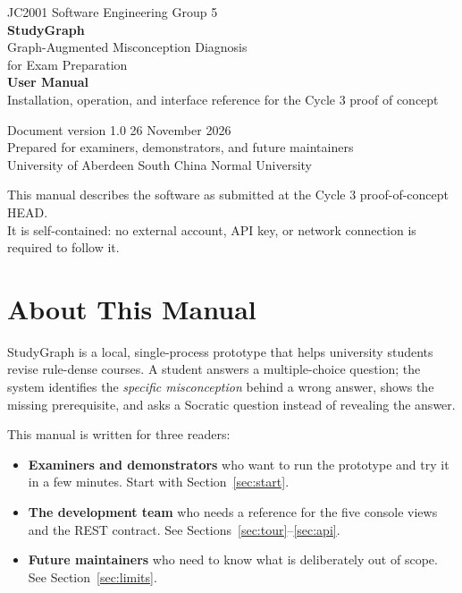 \documentclass[11pt,a4paper]{article}
\begin{document}
\begin{titlepage}
\centering
\vspace*{3.2cm}
{\sffamily\small\color{soft} JC2001 Software Engineering \textperiodcentered{} Group 5}\\[0.5cm]
{\sffamily\bfseries\fontsize{34}{40}\selectfont\color{ink} StudyGraph}\\[0.35cm]
{\sffamily\large\color{soft} Graph-Augmented Misconception Diagnosis\\ for Exam Preparation}\\[2.2cm]
{\sffamily\bfseries\Large\color{accent} User Manual}\\[0.3cm]
{\sffamily\normalsize\color{soft} Installation, operation, and interface reference for the Cycle 3 proof of concept}\\[3.2cm]

\begin{minipage}{0.78\textwidth}
\centering
{\sffamily\small\color{soft}
Document version 1.0 \textperiodcentered{} 26 November 2026\\[0.2cm]
Prepared for examiners, demonstrators, and future maintainers\\
University of Aberdeen \textperiodcentered{} South China Normal University}
\end{minipage}

\vfill
{\sffamily\footnotesize\color{soft} This manual describes the software as submitted at the Cycle 3 proof-of-concept HEAD.\\
It is self-contained: no external account, API key, or network connection is required to follow it.}
\end{titlepage}

\tableofcontents
\newpage

\section{About This Manual}

StudyGraph is a local, single-process prototype that helps university students revise rule-dense courses.
A student answers a multiple-choice question; the system identifies the \emph{specific misconception} behind a
wrong answer, shows the missing prerequisite, and asks a Socratic question instead of revealing the answer.

This manual is written for three readers:

\begin{itemize}[leftmargin=1.4em,itemsep=0.15em]
  \item \textbf{Examiners and demonstrators} who want to run the prototype and try it in a few minutes. Start with Section~\ref{sec:start}.
  \item \textbf{The development team} who needs a reference for the five console views and the REST contract. See Sections~\ref{sec:tour}--\ref{sec:api}.
  \item \textbf{Future maintainers} who need to know what is deliberately out of scope. See Section~\ref{sec:limits}.
\end{itemize}
\end{document}
